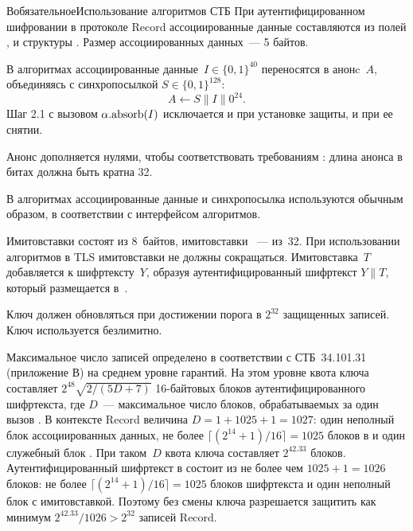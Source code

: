 \begin{appendix}{В}{обязательное}{Использование алгоритмов СТБ}
При аутентифицированном шифровании в протоколе Record ассоциированные 
данные составляются из полей , 
 и  структуры 
. Размер ассоциированных данных~--- 5 байтов.

В алгоритмах  ассоциированные данные~$I\in\{0,1\}^{40}$ 
переносятся в анонc~$A$, объединяясь с синхропосылкой $S\in\{0,1\}^{128}$:
$$
A\gets S\parallel I\parallel 0^{24}.
$$
Шаг 2.1 с вызовом $\alpha.\code{absorb}(I)$ исключается и при установке защиты, 
и при ее снятии.

\begin{note}
Анонс дополняется нулями, чтобы соответствовать требованиям 
: длина анонса в битах должна быть кратна 32.
\end{note}

В алгоритмах  ассоциированные данные и синхропосылка 
используются обычным образом, в соответствии с интерфейсом алгоритмов.

Имитовставки  состоят из 8~байтов, имитовставки 
~--- из~32. При использовании алгоритмов в TLS
имитовставки не должны сокращаться. Имитовставка~$T$ добавляется к 
шифртексту~$Y$, образуя аутентифицированный шифртекст $Y\parallel T$,
который размещается в~.

Ключ  должен обновляться при достижении порога в $2^{32}$ 
защищенных записей. Ключ  используется безлимитно.

\begin{note}
Максимальное число записей  определено в соответствии с 
СТБ~34.101.31 (приложение В) на среднем уровне гарантий. 
%
На этом уровне квота ключа составляет $2^{48}\sqrt{2/(5D+7)}$ 16-байтовых блоков
аутентифицированного шифртекста, где $D$~--- максимальное число блоков, 
обрабатываемых за один вызов . 
%
В контексте Record величина $D=1+1025+1=1027$: 
один неполный блок ассоциированных данных, не более 
$\lceil(2^{14}+1)/16\rceil=1025$ блоков в  и один 
служебный блок .
%
При таком~$D$ квота ключа составляет $2^{42.33}$ блоков.
%
Аутентифицированный шифртекст в 
состоит из не более чем $1025+1=1026$ блоков: не более 
$\lceil(2^{14}+1)/16\rceil=1025$ блоков шифртекста и один неполный блок с 
имитовставкой.
%
Поэтому без смены ключа разрешается защитить как минимум 
$2^{42.33}/1026>2^{32}$ записей Record.
\end{note}


\end{appendix}
